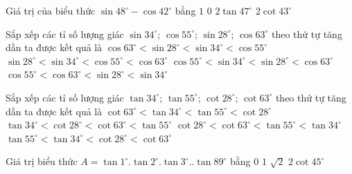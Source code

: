 \begin{ex}%
	Giá trị của biểu thức $\sin 48^\circ-\cos 42^\circ$ bằng
	\choice
	{$1$}
	{\True $0$}
	{$2\tan 47^\circ$}
	{$2\cot 43^\circ$}
\end{ex}
\begin{ex}%
	Sắp xếp các tỉ số lượng giác $\sin 34^\circ$; $\cos 55^\circ$; $\sin 28^\circ$; $\cos 63^\circ$ theo thứ tự tăng dần ta được kết quả là
	\choice
	{\True $\cos 63^\circ < \sin 28^\circ < \sin 34^\circ < \cos 55^\circ$}
	{$\sin 28^\circ < \sin 34^\circ < \cos 55^\circ < \cos 63^\circ$}
	{$\cos 55^\circ < \sin 34^\circ < \sin 28^\circ < \cos 63^\circ$}
	{$\cos 55^\circ < \cos 63^\circ < \sin 28^\circ < \sin 34^\circ$}
\end{ex}
\begin{ex}%
	Sắp xếp các tỉ số lượng giác $\tan 34^\circ$; $\tan 55^\circ$; $\cot 28^\circ$; $\cot 63^\circ$ theo thứ tự tăng dần ta được kết quả là
	\choice
	{\True $\cot 63^\circ < \tan 34^\circ < \tan 55^\circ < \cot 28^\circ$}
	{$\tan 34^\circ < \cot 28^\circ < \cot 63^\circ < \tan 55^\circ$}
	{$\cot 28^\circ < \cot 63^\circ < \tan 55^\circ < \tan 34^\circ$}
	{$\tan 55^\circ < \tan 34^\circ < \cot 28^\circ < \cot 63^\circ$}
\end{ex}
\begin{ex}%
%
Giá trị biểu thức $A=\tan 1^\circ.\tan 2^\circ.\tan 3^\circ..\tan 89^\circ$ bằng
\choice
{$0$}
{\True $1$}
{$\sqrt{2}$}
{$2\cot 45^\circ$}
\end{ex}
